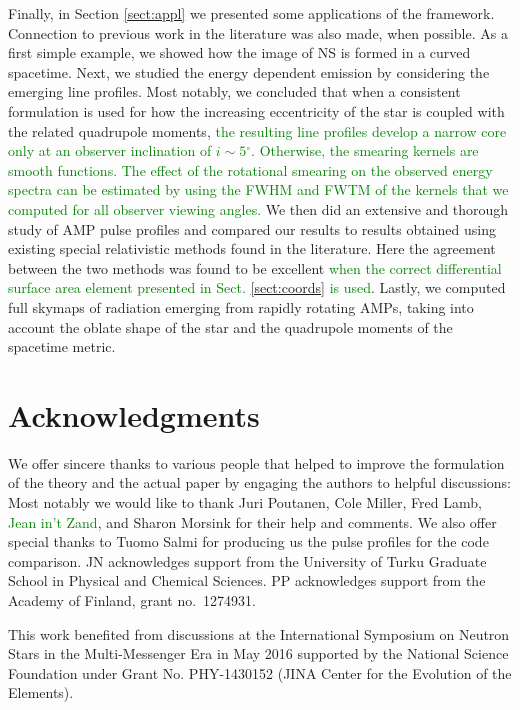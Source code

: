 \documentclass{aa}
\newcommand{\red}[1]{\textcolor{red}{#1}}
\newcommand{\refe}[1]{\textcolor{green}{{#1}}}
\renewcommand{\deg}{\ensuremath{^{\circ}}}
\begin{document}
Finally, in Section \ref{sect:appl} we presented some applications of the framework.
Connection to previous work in the literature was also made, when possible.
As a first simple example, we showed how the image of NS is formed in a curved spacetime.
Next, we studied the energy dependent emission by considering the emerging line profiles.
Most notably, we concluded that when a consistent formulation is used for how the increasing eccentricity of the star is coupled with the related quadrupole moments, \refe{the resulting line profiles develop a narrow core only at an observer inclination of $i \sim 5\deg$.}
\refe{Otherwise, the smearing kernels are smooth functions.}
\refe{The effect of the rotational smearing on the observed energy spectra can be estimated by using the FWHM and FWTM of the kernels that we computed for all observer viewing angles.}
We then did an extensive and thorough study of AMP pulse profiles and compared our results to results obtained using existing special relativistic methods found in the literature.
Here the agreement between the two methods was found to be excellent \refe{when the correct differential surface area element presented in Sect. \ref{sect:coords} is used}.
Lastly, we computed full skymaps of radiation emerging from rapidly rotating AMPs, taking into account the oblate shape of the star and the quadrupole moments of the spacetime metric.



\section*{Acknowledgments}

\small{
We offer sincere thanks to various people that helped to improve the formulation of the theory and the actual paper by engaging the authors to helpful discussions: 
Most notably we would like to thank Juri Poutanen, Cole Miller, Fred Lamb, \refe{Jean in't Zand}, and Sharon Morsink for their help and comments.
We also offer special thanks to Tuomo Salmi for producing us the pulse profiles for the code comparison.
JN acknowledges support from the University of Turku Graduate School in Physical and Chemical Sciences.
PP acknowledges support from the Academy of Finland, grant no.~1274931.

This work benefited from discussions at the International Symposium on Neutron Stars in the Multi-Messenger Era in May 2016 supported by the National Science Foundation under Grant No. PHY-1430152 (JINA Center for the Evolution of the Elements).
}
\end{document}
